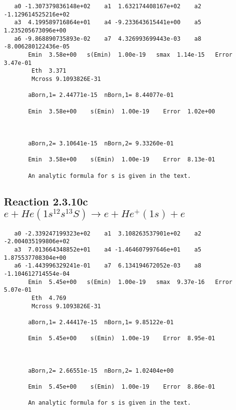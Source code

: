 \documentclass[12pt,dvipdfm]{article}
\begin{document}
\begin{small}\begin{verbatim}
   a0 -1.307379836148e+02    a1  1.632174408167e+02    a2 -1.129614525216e+02
   a3  4.199589716864e+01    a4 -9.233643615441e+00    a5  1.235205673096e+00
   a6 -9.868890735893e-02    a7  4.326993699443e-03    a8 -8.006280122436e-05
       Emin  3.58e+00   s(Emin)  1.00e-19   smax  1.14e-15   Error  3.47e-01
        Eth  3.371
        Mcross 9.1093826E-31

       aBorn,1= 2.44771e-15  nBorn,1= 8.44077e-01

       Emin  3.58e+00    s(Emin)  1.00e-19    Error  1.02e+00



       aBorn,2= 3.10641e-15  nBorn,2= 9.33260e-01

       Emin  3.58e+00    s(Emin)  1.00e-19    Error  8.13e-01

       An analytic formula for s is given in the text.
\end{verbatim}\end{small}




\newpage
\subsection{
Reaction 2.3.10c $e + He(1s^12s^13S) \rightarrow e + He^+(1s) + e$}

















\begin{small}\begin{verbatim}
   a0 -2.339247199323e+02    a1  3.108263537901e+02    a2 -2.004035199806e+02
   a3  7.013664348852e+01    a4 -1.464607997646e+01    a5  1.875537708304e+00
   a6 -1.443996329241e-01    a7  6.134194672052e-03    a8 -1.104612714554e-04
       Emin  5.45e+00   s(Emin)  1.00e-19   smax  9.37e-16   Error  5.07e-01
        Eth  4.769
        Mcross 9.1093826E-31

       aBorn,1= 2.44417e-15  nBorn,1= 9.85122e-01

       Emin  5.45e+00    s(Emin)  1.00e-19    Error  8.95e-01



       aBorn,2= 2.66551e-15  nBorn,2= 1.02404e+00

       Emin  5.45e+00    s(Emin)  1.00e-19    Error  8.86e-01

       An analytic formula for s is given in the text.
\end{verbatim}\end{small}
\end{document}
